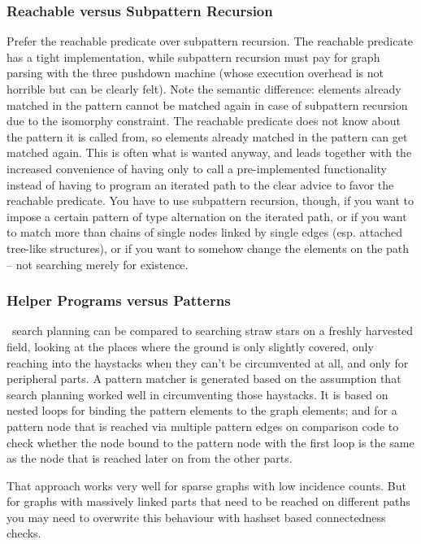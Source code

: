\subsubsection*{Reachable versus Subpattern Recursion}
Prefer the reachable predicate over subpattern recursion.
The reachable predicate has a tight implementation, while subpattern recursion must pay for graph parsing with the three pushdown machine (whose execution overhead is not horrible but can be clearly felt).
Note the semantic difference: elements already matched in the pattern cannot be matched again in case of subpattern recursion due to the isomorphy constraint. 
The reachable predicate does not know about the pattern it is called from, so elements already matched in the pattern can get matched again.
This is often what is wanted anyway, and leads together with the increased convenience of having only to call a pre-implemented functionality instead of having to program an iterated path to the clear advice to favor the reachable predicate.
You have to use subpattern recursion, though, if you want to impose a certain pattern of type alternation on the iterated path, 
or if you want to match more than chains of single nodes linked by single edges (esp. attached tree-like structures), 
or if you want to somehow change the elements on the path -- not searching merely for existence.

\subsubsection*{Helper Programs versus Patterns}
\GrG\ search planning can be compared to searching straw stars on a freshly harvested field,
looking at the places where the ground is only slightly covered, 
only reaching into the haystacks when they can't be circumvented at all, and only for peripheral parts.
A pattern matcher is generated based on the assumption that search planning worked well in circumventing those haystacks. 
It is based on nested loops for binding the pattern elements to the graph elements;
and for a pattern node that is reached via multiple pattern edges
on comparison code to check
whether the node bound to the pattern node with the first loop
is the same as the node that is reached later on from the other parts. 

That approach works very well for sparse graphs with low incidence counts.
But for graphs with massively linked parts that need to be reached on different paths you may need to overwrite this behaviour with hashset based connectedness checks.

